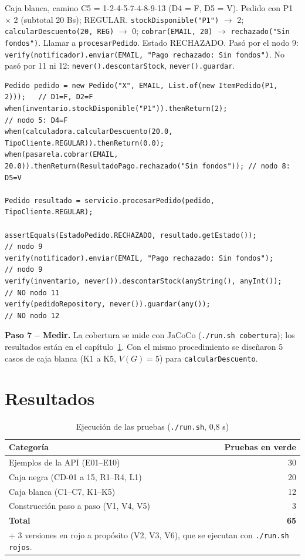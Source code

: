 \documentclass[11pt,a4paper,oneside]{report}
\newcommand{\code}[1]{\texttt{#1}}
\begin{document}
{Caja blanca, camino C5 = 1-2-4-5-7-4-8-9-13 (D4 = F, D5 = V).}
{Pedido con P1 $\times$ 2 (subtotal 20 Bs); REGULAR.}
{\code{stockDisponible("P1")} $\rightarrow$ 2; \code{calcularDescuento(20, REG)} $\rightarrow$ 0; \code{cobrar(EMAIL, 20)} $\rightarrow$ \code{rechazado("Sin fondos")}.}
{Llamar a \code{procesarPedido}.}
{Estado RECHAZADO.}
{Pasó por el nodo 9: \code{verify(notificador).enviar(EMAIL, "Pago rechazado: Sin fondos")}. No pasó por 11 ni 12: \code{never().descontarStock}, \code{never().guardar}.}

\begin{lstlisting}[caption={Camino C5: cada línea corresponde a un nodo del grafo}]
Pedido pedido = new Pedido("X", EMAIL, List.of(new ItemPedido(P1, 2)));   // D1=F, D2=F
when(inventario.stockDisponible("P1")).thenReturn(2);                      // nodo 5: D4=F
when(calculadora.calcularDescuento(20.0, TipoCliente.REGULAR)).thenReturn(0.0);
when(pasarela.cobrar(EMAIL, 20.0)).thenReturn(ResultadoPago.rechazado("Sin fondos")); // nodo 8: D5=V

Pedido resultado = servicio.procesarPedido(pedido, TipoCliente.REGULAR);

assertEquals(EstadoPedido.RECHAZADO, resultado.getEstado());               // nodo 9
verify(notificador).enviar(EMAIL, "Pago rechazado: Sin fondos");           // nodo 9
verify(inventario, never()).descontarStock(anyString(), anyInt());         // NO nodo 11
verify(pedidoRepository, never()).guardar(any());                          // NO nodo 12
\end{lstlisting}

\textbf{Paso 7 -- Medir.} La cobertura se mide con JaCoCo (\code{./run.sh cobertura}); los resultados están en el capítulo~\ref{cap:resultados}. Con el mismo procedimiento se diseñaron 5 casos de caja blanca (K1 a K5, $V(G) = 5$) para \code{calcularDescuento}.

\chapter{Resultados}
\label{cap:resultados}
\begin{table}[H]
\centering
\caption{Ejecución de las pruebas (\code{./run.sh}, 0,8 s)}
\small
\begin{tabular}{lr}
\toprule
\textbf{Categoría} & \textbf{Pruebas en verde}\\
\midrule
Ejemplos de la API (E01--E10) & 30\\
Caja negra (CD-01 a 15, R1--R4, L1) & 20\\
Caja blanca (C1--C7, K1--K5) & 12\\
Construcción paso a paso (V1, V4, V5) & 3\\
\midrule
\textbf{Total} & \textbf{65}\\
\multicolumn{2}{l}{\scriptsize + 3 versiones en rojo a propósito (V2, V3, V6), que se ejecutan con \code{./run.sh rojos}.}\\
\bottomrule
\end{tabular}
\end{table}
\end{document}
